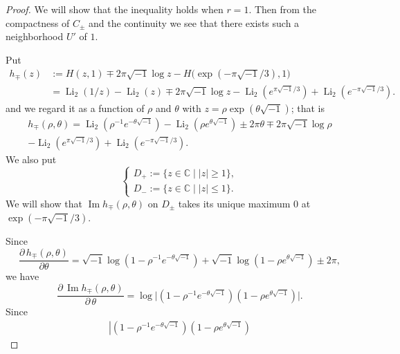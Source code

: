 \documentclass[a4paper]{amsart}
\theoremstyle{plain}
\theoremstyle{definition}
\theoremstyle{remark}
\newcommand{\C}{\mathbb{C}}
\newcommand{\Li}{\operatorname{Li}}
\renewcommand{\Im}{\operatorname{Im}}
\numberwithin{equation}{section}
\begin{document}
\begin{proof}
We will show that the inequality holds when $r=1$.
Then from the compactness of $C_{\pm}$ and the continuity we see that there
exists such a neighborhood $U'$ of $1$.
\par
Put
\begin{equation*}
\begin{split}
  h_{\mp}(z)
  &:=
  H(z,1)\mp2\pi\sqrt{-1}\log{z}-H\bigl(\exp(-\pi\sqrt{-1}/3),1\bigr)
  \\
  &=
  \Li_2(1/z)-\Li_2(z)\mp2\pi\sqrt{-1}\log{z}
  -\Li_2\left(e^{\pi\sqrt{-1}/3}\right)
  +\Li_2\left(e^{-\pi\sqrt{-1}/3}\right).
\end{split}
\end{equation*}
and we regard it as a function of $\rho$ and $\theta$ with
$z=\rho\exp(\theta\sqrt{-1})$; that is
\begin{multline*}
  h_{\mp}(\rho,\theta)
  =
  \Li_2\left(\rho^{-1}{e}^{-\theta\sqrt{-1}}\right)
  -
  \Li_2\left(\rho{e}^{\theta\sqrt{-1}}\right)
  \pm
  2\pi\theta
  \mp
  2\pi\sqrt{-1}\log{\rho}
  \\
  -\Li_2\left(e^{\pi\sqrt{-1}/3}\right)
  +\Li_2\left(e^{-\pi\sqrt{-1}/3}\right).
\end{multline*}
We also put
\begin{equation*}
\begin{cases}
  D_{+}:=\{z\in\C\mid|z|\ge1\},
  \\
  D_{-}:=\{z\in\C\mid|z|\le1\}.
\end{cases}
\end{equation*}
We will show that $\Im{h_{\mp}(\rho,\theta)}$ on $D_{\pm}$ takes its unique
maximum $0$ at $\exp(-\pi\sqrt{-1}/3)$.
\par
Since
\begin{equation*}
  \frac{\partial\,h_{\mp}(\rho,\theta)}{\partial\theta}
  =
  \sqrt{-1}\log\left(1-\rho^{-1}{e}^{-\theta\sqrt{-1}}\right)
  +
  \sqrt{-1}\log\left(1-\rho{e}^{\theta\sqrt{-1}}\right)
  \pm
  2\pi,
\end{equation*}
we have
\begin{equation*}
  \frac{\partial\,\Im{h_{\mp}(\rho,\theta)}}{\partial\,\theta}
  =
  \log
  \biggl|
    \left(1-\rho^{-1}{e}^{-\theta\sqrt{-1}}\right)
    \left(1-\rho     {e}^{ \theta\sqrt{-1}}\right)
  \biggr|.
\end{equation*}
Since
\begin{equation*}
\begin{split}
  \left|
    \left(1-\rho^{-1}{e}^{-\theta\sqrt{-1}}\right)
    \left(1-\rho     {e}^{ \theta\sqrt{-1}}\right)

\end{split}
\end{equation*}
\end{proof}
\end{document}

